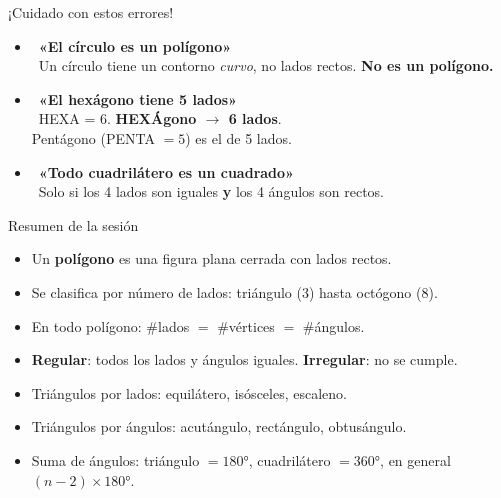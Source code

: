 \documentclass[aspectratio=169, 10pt, spanish]{beamer}
\begin{document}
\begin{frame}{¡Cuidado con estos errores!}
  \begin{errorbox}
    \begin{itemize}
      \item \incorrecto\ \textbf{«El círculo es un polígono»}
            \\
            \correcto\ Un círculo tiene un contorno \emph{curvo}, no lados rectos.
            \textbf{No es un polígono.}
      \vspace{0.3cm}
      \item \incorrecto\ \textbf{«El hexágono tiene 5 lados»}
            \\
            \correcto\ HEXA = 6. \quad
            \textbf{HEXÁgono $\rightarrow$ 6 lados}.
            \\
            Pentágono (PENTA $= 5$) es el de 5 lados.
      \vspace{0.3cm}
      \item \incorrecto\ \textbf{«Todo cuadrilátero es un cuadrado»}
            \\
            \correcto\ Solo si los 4 lados son iguales
            \textbf{y} los 4 ángulos son rectos.
    \end{itemize}
  \end{errorbox}
\end{frame}

\begin{frame}{Resumen de la sesión}
  \begin{resumenbox}
    \begin{itemize}
      \item Un \textbf{polígono} es una figura plana cerrada con lados rectos.
      \item Se clasifica por número de lados: triángulo (3) hasta octógono (8).
      \item En todo polígono: \#lados $=$ \#vértices $=$ \#ángulos.
      \item \textbf{Regular}: todos los lados y ángulos iguales.
            \textbf{Irregular}: no se cumple.
      \item Triángulos por lados: equilátero, isósceles, escaleno.
      \item Triángulos por ángulos: acutángulo, rectángulo, obtusángulo.
      \item Suma de ángulos: triángulo $= 180°$, cuadrilátero $= 360°$,
            en general $(n-2)\times 180°$.
    \end{itemize}
  \end{resumenbox}
\end{frame}
\end{document}
